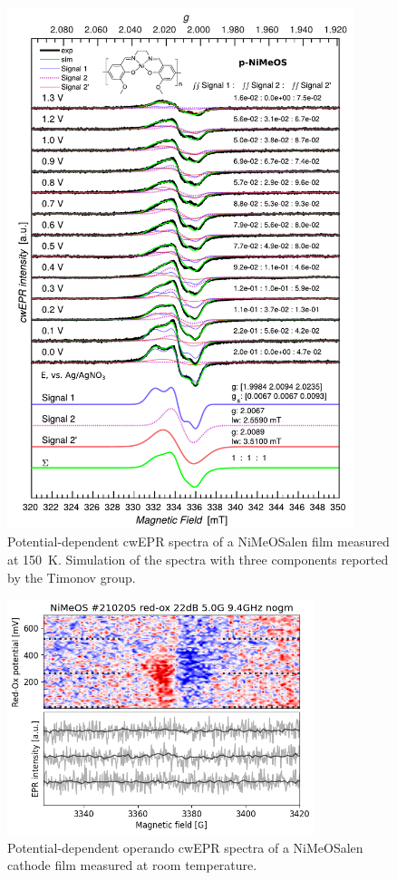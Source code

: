 \begin{figure}[!h]
\center
	\includegraphics[width=0.9\textwidth]{./operando_epr/figures/CRYO/Figure_S8.pdf}
	\caption{Potential-dependent cwEPR spectra of a NiMeOSalen film measured at 150~K. Simulation of the spectra with three components reported by the Timonov group.}
	\label{fig:cwEPR_CRYO_NiSalen_REDOX_SIM}
\end{figure}

\begin{figure}[!ht]
\center
	\includegraphics[width=0.8\textwidth]{./operando_epr/figures/backbone/NiMeOS_lyra_overnight_RT.png}
	\caption{Potential-dependent operando cwEPR spectra of a NiMeOSalen cathode film measured at room temperature.}
	\label{fig:cwEPR_RT_NiSalen_OPERANDO}
\end{figure}

